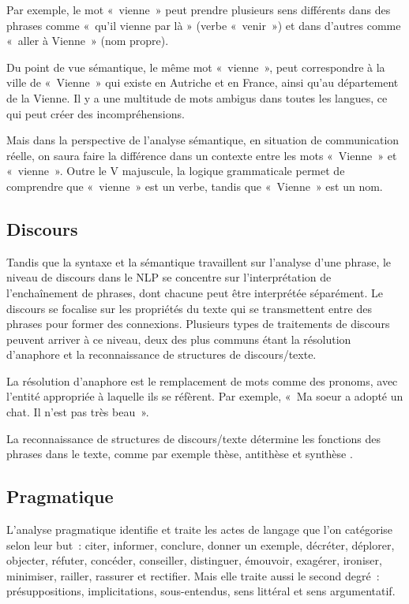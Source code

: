 Par exemple, le mot « vienne » peut prendre plusieurs sens différents dans des phrases comme « qu'il vienne par là » (verbe « venir ») et dans d'autres comme « aller à Vienne » (nom propre). 
\vspace{1em}

	Du point de vue sémantique, le même mot « vienne », peut correspondre à la ville de « Vienne » qui existe en Autriche et en France, ainsi qu'au département de la Vienne. Il y a une multitude de mots ambigus dans toutes les langues, ce qui peut créer des incompréhensions. 
	\vspace{1em}
	
	Mais dans la perspective de l’analyse sémantique, en situation de communication réelle, on saura faire la différence dans un contexte entre les mots « Vienne » et « vienne ». Outre le V majuscule, la logique grammaticale permet de comprendre que « vienne » est un verbe, tandis que « Vienne » est un nom.
	
\subsection{Discours}

Tandis que la syntaxe et la sémantique travaillent sur l’analyse d’une phrase, le niveau de discours dans le NLP se concentre sur l’interprétation de l’enchaînement de phrases, dont chacune peut être interprétée séparément. Le discours se focalise sur les propriétés du texte qui se transmettent entre des phrases pour former des connexions. Plusieurs types de traitements de discours peuvent arriver à ce niveau, deux des plus communs étant la résolution d'anaphore et la reconnaissance de structures de discours/texte. 
\vspace{1em}

	La résolution d'anaphore est le remplacement de mots comme des pronoms, avec l'entité appropriée à laquelle ils se réfèrent. Par exemple, « Ma soeur a adopté un chat. Il n'est pas très beau ».
	\vspace{1em}
	
	La reconnaissance de structures de discours/texte détermine les fonctions des phrases  dans le texte, comme par exemple  thèse, antithèse et synthèse .
	
\subsection{Pragmatique}

L’analyse pragmatique identifie et traite les actes de langage que l’on catégorise selon leur but : citer, informer, conclure, donner un exemple, décréter, déplorer, objecter, réfuter, concéder, conseiller, distinguer, émouvoir, exagérer, ironiser, minimiser, railler, rassurer et rectifier. Mais elle traite aussi le second degré : présuppositions, implicitations, sous-entendus, sens littéral et sens argumentatif.
	\vspace{1em}
	
